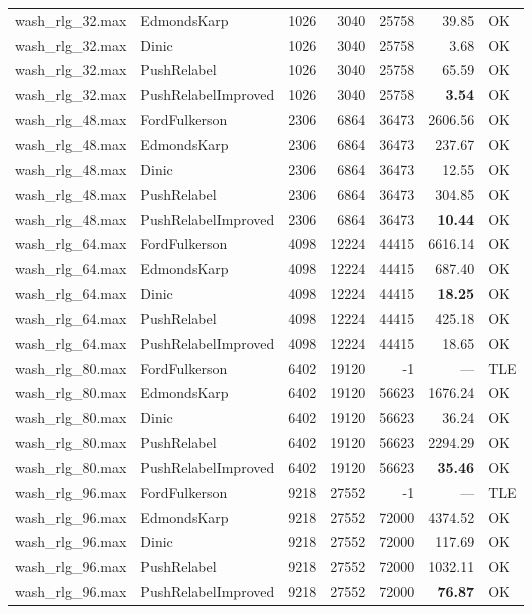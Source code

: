 \begin{longtable}{llrrrrl}
wash\_rlg\_32.max & EdmondsKarp & 1026 & 3040 & 25758 & 39.85 & OK \\
wash\_rlg\_32.max & Dinic & 1026 & 3040 & 25758 & 3.68 & OK \\
wash\_rlg\_32.max & PushRelabel & 1026 & 3040 & 25758 & 65.59 & OK \\
wash\_rlg\_32.max & PushRelabelImproved & 1026 & 3040 & 25758 & \textbf{3.54} & OK \\
\midrule
wash\_rlg\_48.max & FordFulkerson & 2306 & 6864 & 36473 & 2606.56 & OK \\
wash\_rlg\_48.max & EdmondsKarp & 2306 & 6864 & 36473 & 237.67 & OK \\
wash\_rlg\_48.max & Dinic & 2306 & 6864 & 36473 & 12.55 & OK \\
wash\_rlg\_48.max & PushRelabel & 2306 & 6864 & 36473 & 304.85 & OK \\
wash\_rlg\_48.max & PushRelabelImproved & 2306 & 6864 & 36473 & \textbf{10.44} & OK \\
\midrule
wash\_rlg\_64.max & FordFulkerson & 4098 & 12224 & 44415 & 6616.14 & OK \\
wash\_rlg\_64.max & EdmondsKarp & 4098 & 12224 & 44415 & 687.40 & OK \\
wash\_rlg\_64.max & Dinic & 4098 & 12224 & 44415 & \textbf{18.25} & OK \\
wash\_rlg\_64.max & PushRelabel & 4098 & 12224 & 44415 & 425.18 & OK \\
wash\_rlg\_64.max & PushRelabelImproved & 4098 & 12224 & 44415 & 18.65 & OK \\
\midrule
wash\_rlg\_80.max & FordFulkerson & 6402 & 19120 & -1 & --- & TLE \\
wash\_rlg\_80.max & EdmondsKarp & 6402 & 19120 & 56623 & 1676.24 & OK \\
wash\_rlg\_80.max & Dinic & 6402 & 19120 & 56623 & 36.24 & OK \\
wash\_rlg\_80.max & PushRelabel & 6402 & 19120 & 56623 & 2294.29 & OK \\
wash\_rlg\_80.max & PushRelabelImproved & 6402 & 19120 & 56623 & \textbf{35.46} & OK \\
\midrule
wash\_rlg\_96.max & FordFulkerson & 9218 & 27552 & -1 & --- & TLE \\
wash\_rlg\_96.max & EdmondsKarp & 9218 & 27552 & 72000 & 4374.52 & OK \\
wash\_rlg\_96.max & Dinic & 9218 & 27552 & 72000 & 117.69 & OK \\
wash\_rlg\_96.max & PushRelabel & 9218 & 27552 & 72000 & 1032.11 & OK \\
wash\_rlg\_96.max & PushRelabelImproved & 9218 & 27552 & 72000 & \textbf{76.87} & OK \\
\end{longtable}
\endgroup
